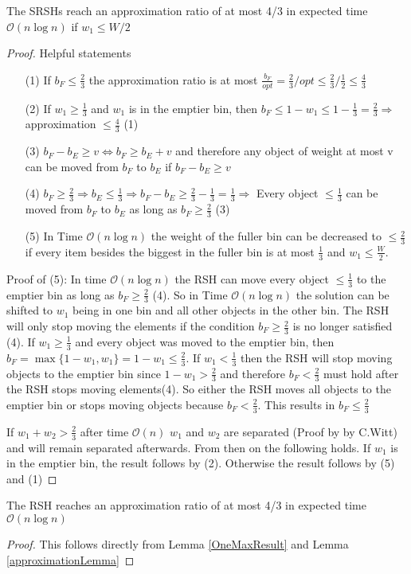 \begin{lemma}\label{approximationLemma}
    The SRSHs reach an approximation ratio of at most 4/3 in expected time $\mathcal{O}(n\log{}n)$ if $w_1 \le W/2$
\end{lemma}
\begin{proof}
    Helpful statements
    \begin{itemize}
        \item[(1)]\label{helpPoint1} If \(b_F \le \frac{2}{3}\) the approximation ratio is at most \(\frac{b_F}{opt} = \frac{2}{3} / opt \le \frac{2}{3} / \frac{1}{2} \le \frac{4}{3}\)
        \item[(2)]\label{helpPoint2} If \(w_1 \ge \frac{1}{3}\) and \(w_1\) is in the emptier bin, then \( b_F \le 1 - w_1 \le 1 - \frac{1}{3} = \frac{2}{3} \Rightarrow\) approximation  \(\le \frac{4}{3}\) (1)
        \item[(3)]\label{helpPoint3} \(b_F - b_E \ge v \Leftrightarrow b_F \ge b_E + v\) and therefore any object of weight at most v can be moved from $b_F$ to $b_E$ if \(b_F - b_E \ge v\)
        \item[(4)]\label{helpPoint4} \(b_F \ge \frac{2}{3} \Rightarrow b_E \le \frac{1}{3} \Rightarrow b_F - b_E \ge \frac{2}{3} - \frac{1}{3} = \frac{1}{3} \Rightarrow\) Every object \(\le \frac{1}{3}\) can be moved from $b_F$ to $b_E$ as long as \(b_F \ge \frac{2}{3}\) (3)
        \item[(5)]\label{helpPoint5} In Time $\mathcal{O}(n\log{}n)$ the weight of the fuller bin can be decreased to \(\le \frac{2}{3}\) if every item besides the biggest in the fuller bin is at most $\frac{1}{3}$ and \(w_1 \le \frac{W}{2}\).
    \end{itemize}
    Proof of (5): \newline
    In time $\mathcal{O}(n\log{}n)$ the RSH can move every object $\le \frac{1}{3}$ to the emptier bin as long as $b_F \ge \frac{2}{3}$ (4). So in Time $\mathcal{O}(n\log{}n)$ the solution can be shifted to $w_1$ being in one bin and all other objects in the other bin. The RSH will only stop moving the elements if the condition $b_F \ge \frac{2}{3}$ is no longer satisfied (4). If \(w_1 \ge \frac{1}{3}\) and every object was moved to the emptier bin, then \(b_F = \max\{1-w_1, w_1\} = 1-w_1 \le \frac{2}{3}\). If \(w_1 < \frac{1}{3}\) then the RSH will stop moving objects to the emptier bin since \(1-w_1 > \frac{2}{3}\) and therefore \(b_F < \frac{2}{3}\) must hold after the RSH stops moving elements(4). So either the RSH moves all objects to the emptier bin or stops moving objects because $b_F < \frac{2}{3}$. This results in $b_F \le \frac{2}{3}$


    If \(w_1+w_2 > \frac{2}{3}\) after time $\mathcal{O}(n)$ $w_1$ and $w_2$ are separated (Proof by by C.Witt) and will remain separated afterwards. From then on the following holds. If $w_1$ is in the emptier bin, the result follows by (2). Otherwise the result follows by (5) and (1)
\end{proof}

\begin{corollary}
    The RSH reaches an approximation ratio of at most 4/3 in expected time $\mathcal{O}(n\log{}n)$
\end{corollary}
\begin{proof}
    This follows directly from Lemma \ref{OneMaxResult} and Lemma \ref{approximationLemma}
\end{proof}